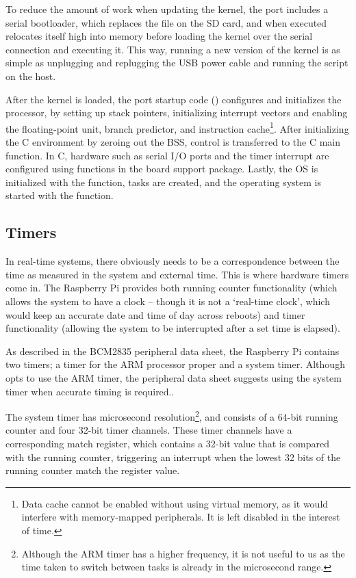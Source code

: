 To reduce the amount of work when updating the kernel, the port includes a serial bootloader, which replaces the  file on the SD card, and when executed relocates itself high into memory before loading the kernel over the serial connection and executing it. This way, running a new version of the kernel is as simple as unplugging and replugging the USB power cable and running the  script on the host.

After the kernel is loaded, the port startup code () configures and initializes the processor, by setting up stack pointers, initializing interrupt vectors and enabling the floating-point unit, branch predictor, and instruction cache\footnote{Data cache cannot be enabled without using virtual memory, as it would interfere with memory-mapped peripherals. It is left disabled in the interest of time.}. After initializing the C environment by zeroing out the BSS, control is transferred to the C main function. In C, hardware such as serial I/O ports and the timer interrupt are configured using functions in the board support package. Lastly, the OS is initialized with the  function, tasks are created, and the operating system is started with the  function.

\subsection{Timers}
In real-time systems, there obviously needs to be a correspondence between the time as measured in the system and external time. This is where hardware timers come in. The Raspberry Pi provides both running counter functionality (which allows the system to have a clock -- though it is not a `real-time clock', which would keep an accurate date and time of day across reboots) and timer functionality (allowing the system to be interrupted after a set time is elapsed).

As described in the BCM2835 peripheral data sheet, the Raspberry Pi contains two timers; a timer for the ARM processor proper and a system timer. Although \textcite{sfd:realpi} opts to use the ARM timer, the peripheral data sheet suggests using the system timer when accurate timing is required.\cite[p. 196]{bcm:2835peripherals}.

The system timer has microsecond resolution\footnote{Although the ARM timer has a higher frequency, it is not useful to us as the time taken to switch between tasks is already in the microsecond range.}, and consists of a 64-bit running counter and four 32-bit timer channels. These timer channels have a corresponding match register, which contains a 32-bit value that is compared with the running counter, triggering an interrupt when the lowest 32 bits of the running counter match the register value.

